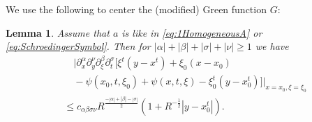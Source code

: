 \documentclass{amsart}
\newtheorem{lemma}[theorem]{Lemma}
\theoremstyle{definition}
\begin{document}
We use the following to center the (modified) Green function $G$:
\begin{lemma}
\label{lem:RegularityPhaseFunction}
Assume that $a$ is like in \eqref{eq:1HomogeneousA} or \eqref{eq:SchroedingerSymbol}. Then for $|\alpha|+|\beta| + |\sigma| + |\nu| \geq 1$ we have
\begin{equation}
\label{eq:RegularityHamiltonII}
\begin{split}
&\quad |\partial_x^{\alpha} \partial_y^{\nu} \partial_{\xi}^{\beta} \partial_t^{\sigma} [ \xi^t (y-x^t) +  \xi_0 (x-x_0) \\
&\quad - \psi(x_0,t,\xi_0) + \psi(x,t,\xi) - \xi_0^t (y-x_0^t)] |_{x=x_0,\xi=\xi_0} \\
&\leq c_{\alpha \beta \sigma \nu} R^{\frac{-|\alpha|+|\beta|-|\sigma|}{2}} (1+R^{-\frac{1}{2}} |y-x_0^t| ).
\end{split}
\end{equation}
\end{lemma}
\end{document}
